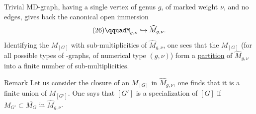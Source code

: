 Trivial MD-graph, having a single vertex of genus $g$, of marked weight $\nu$, and no edges, gives back the canonical open immersion
\[
(26)\qquadM_{g,\nu}\hookrightarrow\widehat{M}_{g,\nu}.
\]
Identifying the $M_{[G]}$ with sub-multiplicities of $\widehat{M}_{g,\nu}$, one sees that the $M_{[G]}$ (for all possible types of -graphs, of numerical type $(g,\nu)$) form a \uline{partition} of $\widehat{M}_{g,\nu}$ into a finite number of sub-multiplicities.

\uline{Remark} Let us consider the closure of an $M_{[G]}$ in $\widehat{M}_{g,\nu}$, one finds that it is a finite union of $M_{[G']}$. One says that $[G']$ is a specialization of $[G]$ if $M_{G'}\subset\overline{M_G}$ in $\widehat{M}_{g,\nu}$.
